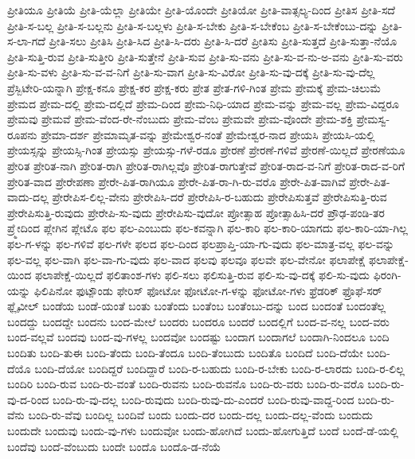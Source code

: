 {ಪ್ರೀತಿಯೂ
ಪ್ರೀತಿಯೆ
ಪ್ರೀತಿ-ಯೆಲ್ಲಾ
ಪ್ರೀತಿಯೇ
ಪ್ರೀತಿ-ಯೊಂದೇ
ಪ್ರೀತಿಯೋ
ಪ್ರೀತಿ-ವಾತ್ಸಲ್ಯ-ದಿಂದ
ಪ್ರೀತಿಸ
ಪ್ರೀತಿ-ಸದೆ
ಪ್ರೀತಿ-ಸ-ಬಲ್ಲ
ಪ್ರೀತಿ-ಸ-ಬಲ್ಲನು
ಪ್ರೀತಿ-ಸ-ಬಲ್ಲಳು
ಪ್ರೀತಿ-ಸ-ಬೇಕು
ಪ್ರೀತಿ-ಸ-ಬೇಕೆಂಬ
ಪ್ರೀತಿ-ಸ-ಬೇಕೆಂಬು-ದನ್ನು
ಪ್ರೀತಿ-ಸ-ಲಾ-ಗದೆ
ಪ್ರೀತಿ-ಸಲು
ಪ್ರೀತಿಸಿ
ಪ್ರೀತಿ-ಸಿದ
ಪ್ರೀತಿ-ಸಿ-ದರು
ಪ್ರೀತಿ-ಸಿ-ದರೆ
ಪ್ರೀತಿಸು
ಪ್ರೀತಿ-ಸುತ್ತದೆ
ಪ್ರೀತಿ-ಸುತ್ತಾ-ನೆಯೊ
ಪ್ರೀತಿ-ಸುತ್ತಿ-ರುವ
ಪ್ರೀತಿ-ಸುತ್ತೀರಿ
ಪ್ರೀತಿ-ಸುತ್ತೇನೆ
ಪ್ರೀತಿ-ಸುವ
ಪ್ರೀತಿ-ಸು-ವನು
ಪ್ರೀತಿ-ಸು-ವ-ನು-ಅ-ವನು
ಪ್ರೀತಿ-ಸು-ವರು
ಪ್ರೀತಿ-ಸು-ವಳು
ಪ್ರೀತಿ-ಸು-ವ-ವ-ನಿಗೆ
ಪ್ರೀತಿ-ಸು-ವಾಗ
ಪ್ರೀತಿ-ಸು-ವಿರೋ
ಪ್ರೀತಿ-ಸು-ವು-ದಕ್ಕೆ
ಪ್ರೀತಿ-ಸು-ವು-ದೆಲ್ಲ
ಪ್ರೆಸ್ಬಿಟೇರಿ-ಯನ್ನಾಗಿ
ಪ್ರೇಕ್ಷ-ಕನೂ
ಪ್ರೇಕ್ಷ-ಕರ
ಪ್ರೇಕ್ಷ-ಕರು
ಪ್ರೇತ
ಪ್ರೇತ-ಗಳಿ-ಗಿಂತ
ಪ್ರೇಮ
ಪ್ರೇಮಕ್ಕೆ
ಪ್ರೇಮ-ಚಿಲುಮೆ
ಪ್ರೇಮದ
ಪ್ರೇಮ-ದಲ್ಲಿ
ಪ್ರೇಮ-ದಲ್ಲಿದೆ
ಪ್ರೇಮ-ದಿಂದ
ಪ್ರೇಮ-ನಿಧಿ-ಯಾದ
ಪ್ರೇಮ-ವನ್ನು
ಪ್ರೇಮ-ವಲ್ಲ
ಪ್ರೇಮ-ವಿದ್ದರೂ
ಪ್ರೇಮವು
ಪ್ರೇಮವೆ
ಪ್ರೇಮ-ವೆಂದ-ರೇ-ನೆಂಬುದು
ಪ್ರೇಮ-ವೆಂಬ
ಪ್ರೇಮವೇ
ಪ್ರೇಮ-ವೊಂದೇ
ಪ್ರೇಮ-ಶಕ್ತಿ
ಪ್ರೇಮಸ್ವ-ರೂಪನು
ಪ್ರೇಮಾ-ದರ್ಶ
ಪ್ರೇಮಾಮೃತ-ವನ್ನು
ಪ್ರೇಮೇಶ್ವರ-ನಂತೆ
ಪ್ರೇಮೇಶ್ವರ-ನಾದ
ಪ್ರೇಯಸಿ
ಪ್ರೇಯಸಿ-ಯಲ್ಲಿ
ಪ್ರೇಯಸ್ಸನ್ನು
ಪ್ರೇಯಸ್ಸಿ-ಗಿಂತ
ಪ್ರೇಯಸ್ಸು
ಪ್ರೇಯಸ್ಸು-ಗಳೆ-ರಡೂ
ಪ್ರೇರಣೆ
ಪ್ರೇರಣೆ-ಗಳಿವೆ
ಪ್ರೇರಣೆ-ಯಿಲ್ಲದೆ
ಪ್ರೇರಣೆಯೂ
ಪ್ರೇರಿತ
ಪ್ರೇರಿತ-ನಾಗಿ
ಪ್ರೇರಿತ-ರಾಗಿ
ಪ್ರೇರಿತ-ರಾಗಿಲ್ಲವೊ
ಪ್ರೇರಿತ-ರಾಗುತ್ತೇವೆ
ಪ್ರೇರಿತ-ರಾದ-ವ-ನಿಗೆ
ಪ್ರೇರಿತ-ರಾದ-ವ-ರಿಗೆ
ಪ್ರೇರಿತ-ವಾದ
ಪ್ರೇರೇಪಣಾ
ಪ್ರೇರೇ-ಪಿತ-ರಾಗಿಯೂ
ಪ್ರೇರೇ-ಪಿತ-ರಾ-ಗಿ-ರು-ವರೊ
ಪ್ರೇರೇ-ಪಿತ-ವಾಗಿವೆ
ಪ್ರೇರೇ-ಪಿತ-ವಾದು-ದಲ್ಲ
ಪ್ರೇರೇಪಿಸ-ಲಿಲ್ಲ-ವೇನು
ಪ್ರೇರೇಪಿಸಿ-ದರೆ
ಪ್ರೇರೇಪಿಸಿ-ರ-ಬಹುದು
ಪ್ರೇರೇಪಿಸುತ್ತವೆ
ಪ್ರೇರೇಪಿಸುತ್ತಿ-ರುವ
ಪ್ರೇರೇಪಿಸುತ್ತಿ-ರುವುದು
ಪ್ರೇರೇಪಿ-ಸು-ವುದು
ಪ್ರೇರೇಪಿಸು-ವುದೋ
ಪ್ರೋತ್ಸಾಹ
ಪ್ರೋತ್ಸಾಹಿಸಿ-ದರೆ
ಪ್ರೌಢ-ಪಂಡಿ-ತರ
ಪ್ರ್ಮೇದಿಂದ
ಪ್ಲೇಗಿನ
ಪ್ಲೇಟೊ
ಫಲ
ಫಲ-ಎಂಬುದು
ಫಲ-ಕವನ್ನಾಗಿ
ಫಲ-ಕಾರಿ
ಫಲ-ಕಾರಿ-ಯಾಗದು
ಫಲ-ಕಾರಿ-ಯಾ-ಗಿಲ್ಲ
ಫಲ-ಗ-ಳನ್ನು
ಫಲ-ಗಳಿವೆ
ಫಲ-ಗಳೇ
ಫಲದ
ಫಲ-ದಿಂದ
ಫಲಪ್ರಾಪ್ತಿ-ಯಾ-ಗು-ವುದು
ಫಲ-ಮಾತ್ರ-ವಲ್ಲ
ಫಲ-ವನ್ನು
ಫಲ-ವಲ್ಲ
ಫಲ-ವಾಗಿ
ಫಲ-ವಾ-ಗು-ವುದು
ಫಲ-ವಾದ
ಫಲವು
ಫಲವೂ
ಫಲವೇ
ಫಲ-ವೇನೋ
ಫಲಾಪೇಕ್ಷೆ
ಫಲಾಪೇಕ್ಷೆ-ಯಿಂದ
ಫಲಾಪೇಕ್ಷೆ-ಯಿಲ್ಲದೆ
ಫಲಿತಾಂಶ-ಗಳು
ಫಲಿ-ಸಲು
ಫಲಿಸುತ್ತಿ-ರುವ
ಫಲಿ-ಸು-ವು-ದಕ್ಕೆ
ಫಲಿ-ಸು-ವುದು
ಫಿರಂಗಿ-ಯನ್ನು
ಫಿಲಿಪಿನೋ
ಫುಟ್ಪೌಂಡು
ಫೇರಿಸ್
ಫೋಟೋ
ಫೋಟೋ-ಗ-ಳನ್ನು
ಫೋಟೋ-ಗಳು
ಫ್ರೆಡರಿಕ್
ಫ್ರೊಫೆ-ಸರ್
ಫ್ಲೈವೀಲ್
ಬಂಡೆಯ
ಬಂಡೆ-ಯಂತೆ
ಬಂತು
ಬಂತೆಂದು
ಬಂತೆಂಬ
ಬಂತೆಂಬು-ದನ್ನು
ಬಂದ
ಬಂದಂತೆ
ಬಂದಂತೆಲ್ಲ
ಬಂದದ್ದು
ಬಂದದ್ದೇ
ಬಂದನು
ಬಂದ-ಮೇಲೆ
ಬಂದರು
ಬಂದರೂ
ಬಂದರೆ
ಬಂದಲ್ಲಿಗೆ
ಬಂದ-ವ-ನಲ್ಲ
ಬಂದ-ವರು
ಬಂದ-ವಲ್ಲವೆ
ಬಂದವು
ಬಂದ-ವು-ಗಳಲ್ಲ
ಬಂದವೋ
ಬಂದಷ್ಟು
ಬಂದಾಗ
ಬಂದಾಗಲೆ
ಬಂದಾಗಿ-ನಿಂದಲೂ
ಬಂದಿ
ಬಂದಿತು
ಬಂದಿ-ತುಈ
ಬಂದಿ-ತೆಂದು
ಬಂದಿ-ತೆಂದೂ
ಬಂದಿ-ತೆಂಬುದು
ಬಂದಿತೊ
ಬಂದಿದೆ
ಬಂದಿ-ದೆಯೇ
ಬಂದಿ-ದೆಯೊ
ಬಂದಿ-ದೆಯೋ
ಬಂದಿದ್ದರೆ
ಬಂದಿದ್ದಾರೆ
ಬಂದಿ-ರ-ಬಹುದು
ಬಂದಿ-ರ-ಬೇಕು
ಬಂದಿ-ರ-ಲಾರದು
ಬಂದಿ-ರ-ಲಿಲ್ಲ
ಬಂದಿರಿ
ಬಂದಿ-ರುವ
ಬಂದಿ-ರು-ವಂತೆ
ಬಂದಿ-ರುವನು
ಬಂದಿ-ರುವನೊ
ಬಂದಿ-ರು-ವರು
ಬಂದಿ-ರು-ವರೊ
ಬಂದಿ-ರು-ವು-ದ-ರಿಂದ
ಬಂದಿ-ರು-ವು-ದಲ್ಲ
ಬಂದಿ-ರುವುದು
ಬಂದಿ-ರುವು-ದು-ಎಂದರೆ
ಬಂದಿ-ರುವು-ವಾದ್ದ-ರಿಂದ
ಬಂದಿ-ರು-ವೆನು
ಬಂದಿ-ರು-ವೆವು
ಬಂದಿಲ್ಲ
ಬಂದಿವೆ
ಬಂದು
ಬಂದು-ದರ
ಬಂದು-ದಲ್ಲ
ಬಂದು-ದಲ್ಲ-ವೆಂದು
ಬಂದುದು
ಬಂದುದೇ
ಬಂದುವು
ಬಂದು-ವು-ಗಳು
ಬಂದುವೋ
ಬಂದು-ಹೋಗಿದೆ
ಬಂದು-ಹೋಗುತ್ತಿದೆ
ಬಂದೆ
ಬಂದೆ-ಡೆ-ಯಲ್ಲಿ
ಬಂದೆವು
ಬಂದೆ-ವೆಂಬುದು
ಬಂದೇ
ಬಂದೊ
ಬಂದೊ-ಡ-ನೆಯೆ
}
